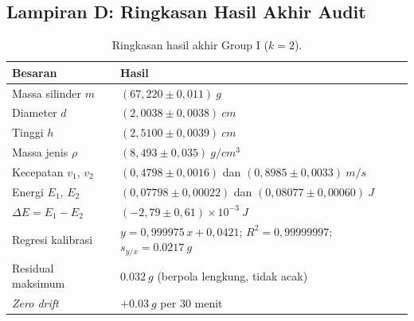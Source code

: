 \documentclass[a4paper, 12pt]{article}
\begin{document}
    \subsection*{Lampiran D: Ringkasan Hasil Akhir Audit}
    \begin{table}[H]
    \centering
    \singlespacing
    \caption{Ringkasan hasil akhir Group I ($k=2$).}
    \label{tab:ringkas}
    \small
    \begin{tabularx}{\textwidth}{@{}l X@{}}
    \toprule
    \textbf{Besaran} & \textbf{Hasil}\\
    \midrule
    Massa silinder $m$ & $(67{,}220\pm0{,}011)\ \si{g}$\\
    Diameter $d$ & $(2{,}0038\pm0{,}0038)\ \si{cm}$\\
    Tinggi $h$ & $(2{,}5100\pm0{,}0039)\ \si{cm}$\\
    Massa jenis $\rho$ & $(8{,}493\pm0{,}035)\ \si{g/cm^3}$\\
    Kecepatan $v_1$, $v_2$ & $(0{,}4798\pm0{,}0016)$ dan $(0{,}8985\pm0{,}0033)\ \si{m/s}$\\
    Energi $E_1$, $E_2$ & $(0{,}07798\pm0{,}00022)$ dan $(0{,}08077\pm0{,}00060)\ \si{J}$\\
    $\Delta E=E_1-E_2$ & $(-2{,}79\pm0{,}61)\times10^{-3}\ \si{J}$\\
    Regresi kalibrasi & $y=0{,}999975\,x+0{,}0421$; $R^2=0{,}99999997$; $s_{y/x}=\SI{0,0217}{g}$\\
    Residual maksimum & $\SI{0,032}{g}$ (berpola lengkung, tidak acak)\\
    \textit{Zero drift} & $+\SI{0,03}{g}$ per $30$ menit\\
    \bottomrule
    \end{tabularx}
    \end{table}
\end{document}
